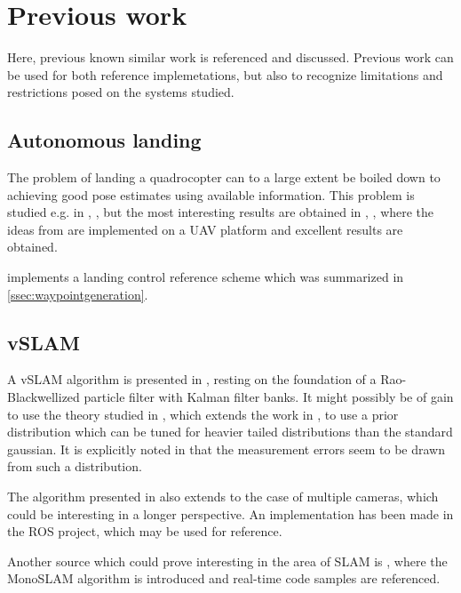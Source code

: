 \section{Previous work}
\label{sec:previouswork}
Here, previous known similar work is referenced and discussed.
Previous work can be used for both reference implemetations, but also to
recognize limitations and restrictions posed on the systems studied.

    \subsection{Autonomous landing}
    The problem of landing a quadrocopter can to a large extent be boiled
    down to achieving good pose estimates using available information.
    This problem is studied e.g. in \cite{DM:MS:10}, \cite{brockers:803111},
    but the most interesting results are obtained in \cite{DBLP:conf/icra/BloschWSS10}, \cite{weiss11monocular},
    where the ideas from \cite{klein07parallel} are implemented on a UAV platform
    and excellent results are obtained. 
    
    \cite{brockers:803111} implements a landing control reference scheme
    which was summarized in \ref{ssec:waypointgeneration}.

    \subsection{vSLAM}
    A vSLAM algorithm is presented in \cite{Karlsson05thevslam}, resting on the 
    foundation of a Rao-Blackwellized particle filter with Kalman filter banks. 
    It might possibly be of gain to use the theory studied in \cite{vandermerwe:upf},
    which extends the work in \cite{Montemerlo+al:AAAI02}, \cite{Montemerlo_2003_4434} to use a prior distribution
    which can be tuned for heavier tailed distributions than the standard gaussian\cite{Merwe04sigma-pointkalman}.
    It is explicitly noted in \cite{Karlsson05thevslam} that the measurement errors seem to
    be drawn from such a distribution.
    
    The algorithm presented in \cite{Karlsson05thevslam} also extends to
    the case of multiple cameras, which could be interesting in a longer perspective.
    An implementation has been made in the ROS project\cite{rosvslam}, which may be used for
    reference.
    
    Another source which could prove interesting in the area of SLAM is \cite{Davison:2007:MRS:1263144.1263479}, where
    the MonoSLAM algorithm is introduced and real-time code samples are referenced.
    
